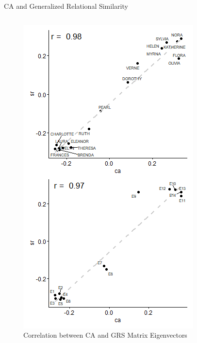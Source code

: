 \documentclass[
  ignorenonframetext,
]{beamer}
\begin{document}
\begin{frame}{CA and Generalized Relational Similarity}
\begin{columns}[T]
\begin{column}{0.3\textwidth}
\begin{figure}
{\centering \includegraphics{Plots/grs-corr-scatter.png}

}

\caption{Correlation between CA and GRS Matrix Eigenvectors}

\end{figure}
\end{column}
\end{columns}
\end{frame}
\end{document}
